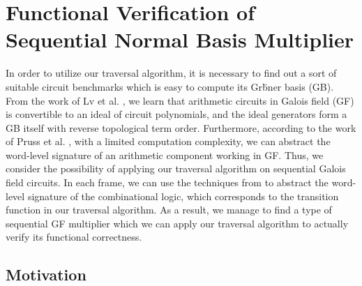 \chapter{Functional Verification of Sequential Normal Basis Multiplier}
\label{ch:normal}
In order to utilize our traversal algorithm, it is necessary to find out
a sort of suitable circuit benchmarks which is easy to compute its
Gr\"bner basis (GB). From the work of Lv et al. \cite{lv_dissertation},
we learn that arithmetic circuits in Galois field (GF) is
convertible to an ideal of circuit polynomials, and the 
ideal generators form a GB itself with reverse topological
term order. Furthermore, according to the work of Pruss et al.
\cite{tim_dissertation}, with a limited computation complexity,
we can abstract the word-level signature of an arithmetic 
component working in GF. Thus, we consider the possibility 
of applying our traversal algorithm on sequential Galois
field circuits. In each frame, we can use the techniques 
from \cite{tim_dissertation} to abstract the word-level
signature of the combinational logic, which corresponds
to the transition function in our traversal algorithm.
As a result, we manage to find a type of sequential GF multiplier
which we can apply our traversal algorithm to actually 
verify its functional correctness.

\section{Motivation}
\label{sec:normal_motiv}
